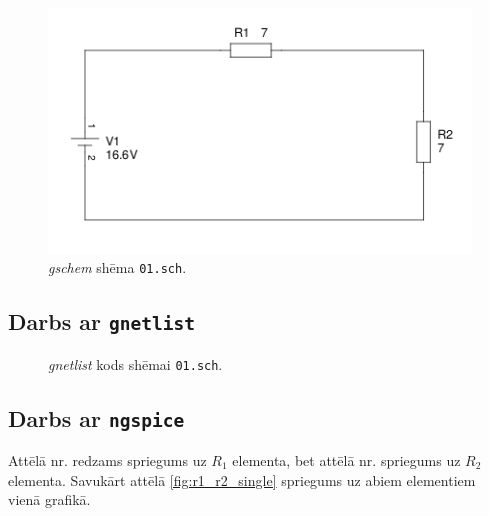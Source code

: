 \documentclass[12pt,table]{report}
\begin{document}
\begin{figure}[H]
\centering
\includegraphics[scale=0.7]{img/gschem_1.png}
\caption{\emph{gschem} shēma \texttt{01.sch}.}
\label{att:shema_01}
\end{figure}


\subsection{Darbs ar \texttt{gnetlist}}
\begin{figure}[H]

\caption{\emph{gnetlist} kods shēmai \texttt{01.sch}.}
\label{att:gnetlist_01}
\end{figure}

\subsection{Darbs ar \texttt{ngspice}}
\label{sec:darbs_ar_ngspice}
Attēlā nr.  redzams spriegums uz $R_1$ elementa, bet attēlā nr.  spriegums uz $R_2$
elementa. Savukārt attēlā \ref{fig:r1_r2_single} spriegums uz abiem elementiem vienā grafikā.
\end{document}
